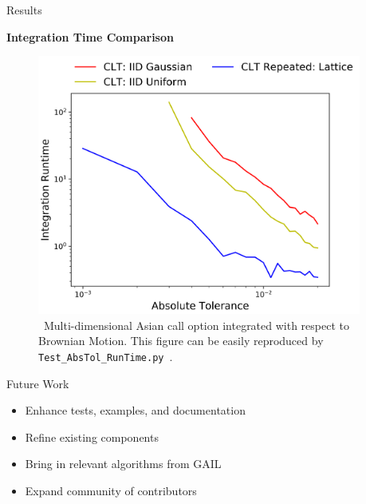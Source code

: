 \documentclass[final]{beamer}
\newcommand{\bfCenter}[1]{\centerline{\textbf{#1}}}
\newlength{\sepwid}
\newlength{\onecolwid}
\begin{document}
\begin{frame}[t]
\begin{columns}[t]
\begin{column}{\sepwid}\end{column}
\begin{column}{\onecolwid}\vspace{-.3in}
\begin{block}{Results}
    \bfCenter{Integration Time Comparison}
    \begin{figure}
        \includegraphics[width=1.05\textwidth]{Images/AbsTol_Runtime_LinePlot.png}
        \vspace{-1ex}
        \caption{\ Multi-dimensional Asian call option integrated with respect to Brownian Motion. This figure can be easily reproduced by \texttt{Test\_AbsTol\_RunTime.py}~\cite{HicEtal19}.}
    \end{figure}
\end{block}

\vspace{-.8in}
\begin{block}{Future Work}
    \begin{itemize}
        \item Enhance tests, examples, and documentation
        \item Refine existing components
        \item Bring in relevant algorithms from GAIL~\cite{ChoEtal19}
        \item Expand community of contributors
    \end{itemize}
\end{block}


\end{column}
\end{columns}
\end{frame}
\end{document}
